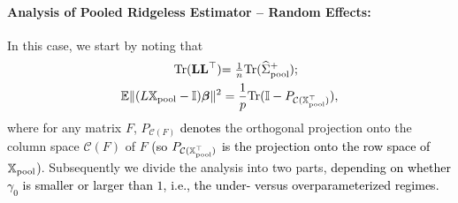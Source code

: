 \documentclass{article}
\theoremstyle{plain}
\theoremstyle{remark}
\def \bbeta{\boldsymbol{\beta}}
\def \bbeta{\boldsymbol{\beta}}
\def \Xm {\mathbb{X}_{\rm pool}}
\def \tr {\mathrm{Tr}}
\def \I{\mathcal{I}}
\def \E{\mathbb{E}}
\def \I {\mathbb{I}}
\begin{document}
\paragraph{Analysis of Pooled Ridgeless Estimator -- Random Effects:} In this case, we start by noting that
\begin{align*}
    \textcolor{black}{\tr(\mathbf{L}\mathbf{L}^\top)}&\textcolor{black}{=\tfrac{1}{n}\tr(\widehat{\Sigma}_{\rm pool}^+);}\\
    \E\|(L\mathbb{X}_{\rm pool}-\I)\bbeta\|^2&=\frac{1}{p}\tr(\I-P_{\mathcal{C}(\textcolor{black}{\Xm^\top})}),
\end{align*}
where for any matrix $F$, $P_{\mathcal{C}(F)}$ \textcolor{black}{denotes} the orthogonal projection onto the column space $\mathcal{C}(F)$ of $F$ \textcolor{black}{(so $P_{\mathcal{C}(\Xm^\top)}$ is the projection onto the row space of $\Xm$)}.
Subsequently we divide the analysis into two parts, \textcolor{black}{depending on whether $\gamma_0$ is smaller or larger than $1$, i.e., the under- versus overparameterized regimes.}
\end{document}

